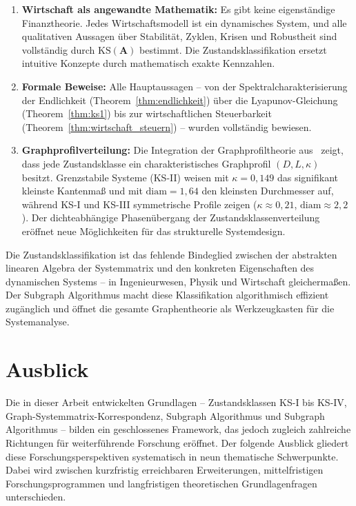 \documentclass[a4paper, 12pt, twoside, openright]{report}
\theoremstyle{definition}
\theoremstyle{definition}
\newcommand{\vA}{\bm{A}}
\newcommand{\KS}{\mathrm{KS}}
\begin{document}
\begin{enumerate}[label=(\roman*)]
  \item \textbf{Wirtschaft als angewandte Mathematik:} Es gibt keine eigenständige
    Finanztheorie. Jedes Wirtschaftsmodell ist ein dynamisches System, und alle
    qualitativen Aussagen über Stabilität, Zyklen, Krisen und Robustheit sind
    vollständig durch $\KS(\vA)$ bestimmt. Die Zustandsklassifikation ersetzt
    intuitive Konzepte durch mathematisch exakte Kennzahlen.

  \item \textbf{Formale Beweise:} Alle Hauptaussagen -- von der Spektralcharakterisierung
    der Endlichkeit (Theorem~\ref{thm:endlichkeit}) über die Lyapunov-Gleichung
    (Theorem~\ref{thm:ks1}) bis zur wirtschaftlichen Steuerbarkeit
    (Theorem~\ref{thm:wirtschaft_steuern}) -- wurden vollständig bewiesen.

  \item \textbf{Graphprofilverteilung:} Die Integration der Graphprofiltheorie
    aus~\citep{epp2026graphs} zeigt, dass jede Zustandsklasse ein charakteristisches
    Graphprofil $(D, L, \kappa)$ besitzt. Grenzstabile Systeme (KS-II) weisen
    mit $\kappa = 0{,}149$ das signifikant kleinste Kantenmaß und mit
    $\mathrm{diam} = 1{,}64$ den kleinsten Durchmesser auf, während KS-I und KS-III
    symmetrische Profile zeigen ($\kappa \approx 0{,}21$, $\mathrm{diam} \approx 2{,}2$).
    Der dichteabhängige Phasenübergang der Zustandsklassenverteilung eröffnet neue
    Möglichkeiten für das strukturelle Systemdesign.
\end{enumerate}

Die Zustandsklassifikation ist das fehlende Bindeglied zwischen der abstrakten linearen
Algebra der Systemmatrix und den konkreten Eigenschaften des dynamischen Systems --
in Ingenieurwesen, Physik und Wirtschaft gleichermaßen. Der Subgraph Algorithmus
macht diese Klassifikation algorithmisch effizient zugänglich und öffnet die gesamte
Graphentheorie als Werkzeugkasten für die Systemanalyse.

\section{Ausblick}
\label{sec:ausblick}

Die in dieser Arbeit entwickelten Grundlagen -- Zustandsklassen KS-I bis KS-IV,
Graph-Systemmatrix-Korrespondenz, Subgraph Algorithmus und Subgraph Algorithmus --
bilden ein geschlossenes Framework, das jedoch zugleich zahlreiche Richtungen für
weiterführende Forschung eröffnet. Der folgende Ausblick gliedert diese
Forschungsperspektiven systematisch in neun thematische Schwerpunkte. Dabei wird
zwischen kurzfristig erreichbaren Erweiterungen, mittelfristigen Forschungsprogrammen
und langfristigen theoretischen Grundlagenfragen unterschieden.
\end{document}
